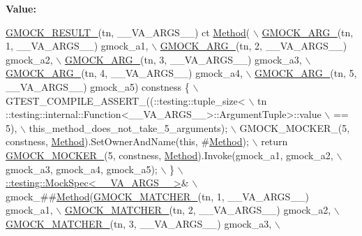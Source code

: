 {\bfseries Value\+:}
\begin{DoxyCode}
\hyperlink{gmock-generated-function-mockers_8h_a0e9d94e9c77df84f1103af06feee1077}{GMOCK\_RESULT\_}(tn, \_\_VA\_ARGS\_\_) ct \hyperlink{gmock-spec-builders__test_8cc_a95606368148f3e5aab5db46c32466afd}{Method}( \(\backslash\)
      \hyperlink{gmock-generated-function-mockers_8h_a887575cc1c31158fba808180a10c004f}{GMOCK\_ARG\_}(tn, 1, \_\_VA\_ARGS\_\_) gmock\_a1, \(\backslash\)
      \hyperlink{gmock-generated-function-mockers_8h_a887575cc1c31158fba808180a10c004f}{GMOCK\_ARG\_}(tn, 2, \_\_VA\_ARGS\_\_) gmock\_a2, \(\backslash\)
      \hyperlink{gmock-generated-function-mockers_8h_a887575cc1c31158fba808180a10c004f}{GMOCK\_ARG\_}(tn, 3, \_\_VA\_ARGS\_\_) gmock\_a3, \(\backslash\)
      \hyperlink{gmock-generated-function-mockers_8h_a887575cc1c31158fba808180a10c004f}{GMOCK\_ARG\_}(tn, 4, \_\_VA\_ARGS\_\_) gmock\_a4, \(\backslash\)
      \hyperlink{gmock-generated-function-mockers_8h_a887575cc1c31158fba808180a10c004f}{GMOCK\_ARG\_}(tn, 5, \_\_VA\_ARGS\_\_) gmock\_a5) constness \{ \(\backslash\)
    GTEST\_COMPILE\_ASSERT\_((::testing::tuple\_size<                          \(\backslash\)
        tn ::testing::internal::Function<\_\_VA\_ARGS\_\_>::ArgumentTuple>::value \(\backslash\)
            == 5), \(\backslash\)
        this\_method\_does\_not\_take\_5\_arguments); \(\backslash\)
    GMOCK\_MOCKER\_(5, constness, \hyperlink{gmock-spec-builders__test_8cc_a95606368148f3e5aab5db46c32466afd}{Method}).SetOwnerAndName(\textcolor{keyword}{this}, #\hyperlink{gmock-spec-builders__test_8cc_a95606368148f3e5aab5db46c32466afd}{Method}); \(\backslash\)
    return \hyperlink{gmock-generated-function-mockers_8h_a7d362499e27b1bc3a9806dd3cf58a5b7}{GMOCK\_MOCKER\_}(5, constness, \hyperlink{gmock-spec-builders__test_8cc_a95606368148f3e5aab5db46c32466afd}{Method}).Invoke(gmock\_a1, gmock\_a2, \(\backslash\)
        gmock\_a3, gmock\_a4, gmock\_a5); \(\backslash\)
  \} \(\backslash\)
  \hyperlink{classtesting_1_1internal_1_1_mock_spec}{::testing::MockSpec<\_\_VA\_ARGS\_\_>}& \(\backslash\)
      gmock\_##\hyperlink{gmock-spec-builders__test_8cc_a95606368148f3e5aab5db46c32466afd}{Method}(\hyperlink{gmock-generated-function-mockers_8h_aa87d0009fe91f1c89d658776b55a769c}{GMOCK\_MATCHER\_}(tn, 1, \_\_VA\_ARGS\_\_) gmock\_a1, \(\backslash\)
                     \hyperlink{gmock-generated-function-mockers_8h_aa87d0009fe91f1c89d658776b55a769c}{GMOCK\_MATCHER\_}(tn, 2, \_\_VA\_ARGS\_\_) gmock\_a2, \(\backslash\)
                     \hyperlink{gmock-generated-function-mockers_8h_aa87d0009fe91f1c89d658776b55a769c}{GMOCK\_MATCHER\_}(tn, 3, \_\_VA\_ARGS\_\_) gmock\_a3, \(\backslash\)

\end{DoxyCode}
